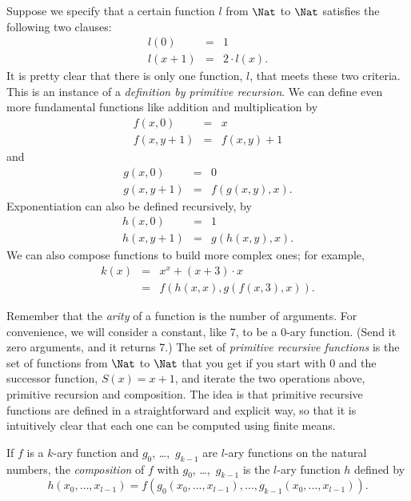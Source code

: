 \documentclass[../../../include/open-logic-section]{subfiles}
\begin{document}

\begin{explain}
Suppose we specify that a certain function $l$ from $\Nat$ to $\Nat$
satisfies the following two clauses:
\begin{eqnarray*}
l(0) & = & 1 \\
l(x+1) & = & 2 \cdot l(x).
\end{eqnarray*}
It is pretty clear that there is only one function, $l$, that meets
these two criteria. This is an instance of a \emph{definition by
  primitive recursion}. We can define even more fundamental functions
like addition and multiplication by
\begin{eqnarray*}
f(x,0) & = & x \\
f(x,y+1) & = & f(x,y)+1
\end{eqnarray*}
and
\begin{eqnarray*}
g(x,0) & = & 0 \\
g(x,y+1) & = & f(g(x,y),x).
\end{eqnarray*}
Exponentiation can also be defined recursively, by
\begin{eqnarray*}
h(x,0) & = & 1 \\
h(x,y+1) & = & g(h(x,y),x).
\end{eqnarray*}
We can also compose functions to build more complex ones; for example,
\begin{eqnarray*}
k(x) & = & x^x + (x + 3) \cdot x \\
& = & f(h(x,x),g(f(x,3),x)).
\end{eqnarray*}

Remember that the \emph{arity} of a function is the number of
arguments. For convenience, we will consider a constant, like 7, to be
a 0-ary function. (Send it zero arguments, and it returns 7.)  The set
of \emph{primitive recursive functions} is the set of functions from
$\Nat$ to $\Nat$ that you get if you start with $0$ and the successor
function, $S(x) = x+1$, and iterate the two operations above,
primitive recursion and composition. The idea is that primitive
recursive functions are defined in a straightforward and explicit
way, so that it is intuitively clear that each one can be computed
using finite means.
\end{explain}

\begin{defn}
If $f$ is a $k$-ary function and $g_0$, \dots,~$g_{k-1}$ are $l$-ary
functions on the natural numbers, the \emph{composition} of $f$ with
$g_0$, \dots,~$g_{k-1}$ is the $l$-ary function $h$ defined by
\[
h(x_0,\dots,x_{l-1}) =
f(g_0(x_0,\dots,x_{l-1}),\dots,g_{k-1}(x_0,\dots,x_{l-1})) .
\]
\end{defn}
\end{document}
